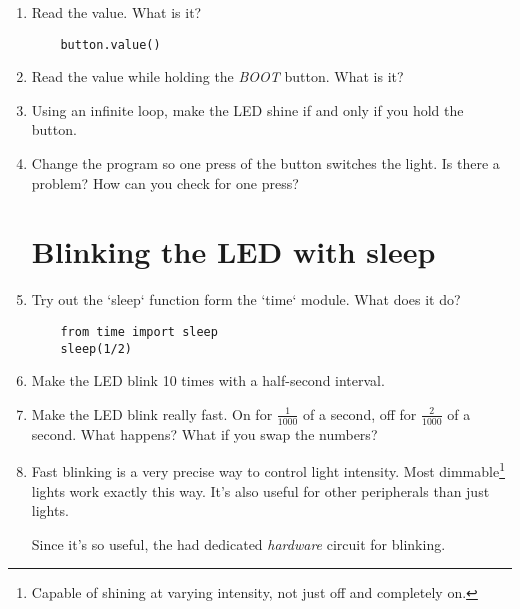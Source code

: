 \documentclass{../tutorial}
\begin{document}
\begin{enumerate}
\item
    Read the value. What is it?

    \begin{lstlisting}
    button.value()
    \end{lstlisting}

\item
    Read the value while holding the \emph{BOOT} button. What is it?

    \begin{comment}
        The \emph{BOOT} button is next to the USB connector.
        Don't confuse it with \emph{EN}!
    \end{comment}

\item
    Using an infinite loop, make the LED shine if and only if you hold the button.

\item
    Change the program so one press of the button switches the light.
    Is there a problem? How can you check for one press?

\section{Blinking the LED with sleep}

\item
    Try out the `sleep` function form the `time` module.
    What does it do?

    \begin{lstlisting}
    from time import sleep
    sleep(1/2)
    \end{lstlisting}

\item
    Make the LED blink 10 times with a half-second interval.

\item
    Make the LED blink really fast.
    On for $\frac{1}{1000}$ of a second, off for $\frac{2}{1000}$ of a second.
    What happens? What if you swap the numbers?

\item
    Fast blinking is a very precise way to control light intensity.
    Most dimmable\footnote{
        Capable of shining at varying intensity, not just off and completely on.
    } lights work exactly this way.
    It's also useful for other peripherals than just lights.

    Since it's so useful, the \ESP had dedicated \emph{hardware }
    circuit for blinking.


\end{enumerate}
\end{document}
